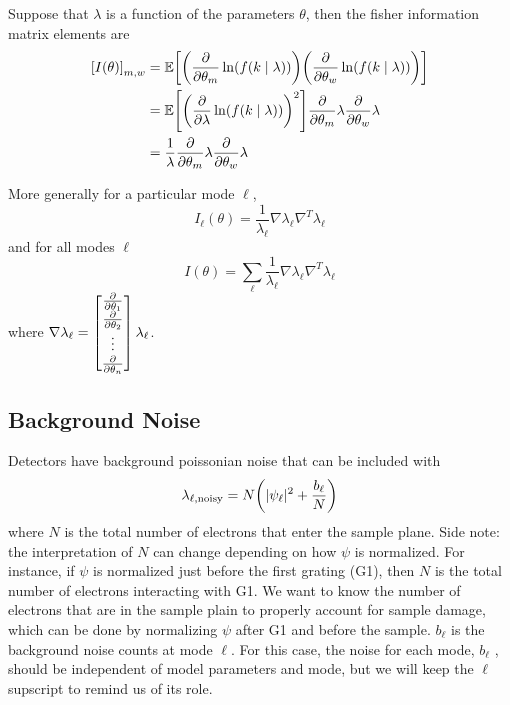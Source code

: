 \documentclass[12pt]{article}
\begin{document}
Suppose that $\lambda$ is a function of the parameters $\theta$, then the fisher information matrix elements are
\begin{align*}
    \qty[I(\theta)]_{m,w} &= 
    \mathbb{E}\qty[
        \qty(\pdv{\theta_m} \ln(f(k\mid \lambda)))
        \qty(\pdv{\theta_w} \ln(f(k\mid \lambda)))
        ] \\
    &= \mathbb{E}\qty[
        \qty(\pdv{\lambda} \ln(f(k\mid \lambda)))^2 
        ] \pdv{\theta_m} \lambda \pdv{\theta_w} \lambda  \\
    &= \frac{1}{\lambda} \pdv{\theta_m} \lambda \pdv{\theta_w} \lambda
\end{align*}

More generally for a particular mode $\ell$,
\begin{equation*}
    \boxed{
    I_\ell(\theta) = 
    \frac{1}{\lambda_\ell} \nabla \lambda_\ell \nabla^T \lambda_\ell
    }
\end{equation*}
and for all modes $\ell$
\begin{equation*}
    \boxed{
    I(\theta) = \sum_{\ell}
    \frac{1}{\lambda_\ell} \nabla \lambda_\ell \nabla^T \lambda_\ell
    }
\end{equation*}
where $\nabla \lambda_\ell = \begin{bmatrix}
    \pdv{\theta_1}  \\
    \pdv{\theta_2} \\
    \vdots \\
    \pdv{\theta_n} 
\end{bmatrix} \lambda_\ell$.

\subsection{Background Noise}
Detectors have background poissonian noise that can be included with 
\begin{equation*}
        \lambda_{\ell, \text{noisy}} = N \qty(|\psi_\ell|^2 + \frac{b_\ell}{N})
\end{equation*}
where $N$ is the total number of electrons that enter the sample plane. Side note: 
the interpretation of $N$ can change depending on how $\psi$ is normalized. For 
instance, if $\psi$ is normalized just before the first grating (G1), then $N$ is the total 
number of electrons interacting with G1. We want to know the number of electrons that are in 
the sample plain to properly account for sample damage, which can be done by normalizing $\psi$ 
after G1 and before the sample. $b_\ell$ is the background noise counts at mode $\ell$. For this case,
the noise for each mode, $b_\ell$ , should be independent of model parameters and mode, but we 
will keep the $\ell$ supscript to remind us of its role.
\end{document}
